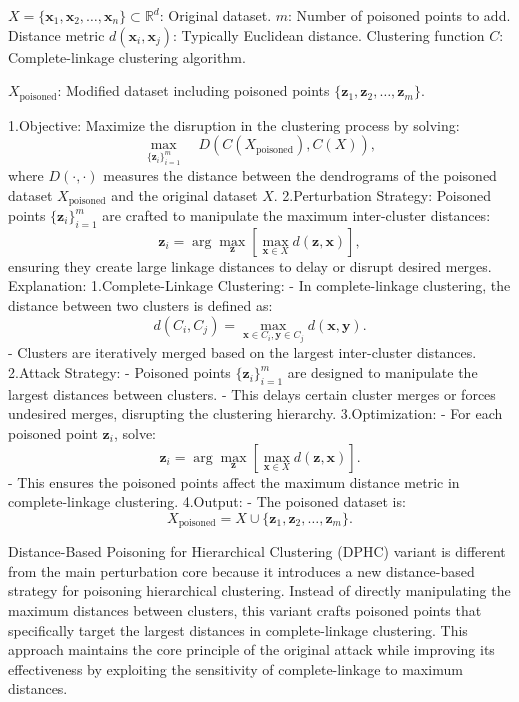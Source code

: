 $X = \{\mathbf{x}_1, \mathbf{x}_2, \ldots, \mathbf{x}_n\} \subset \mathbb{R}^d$: Original dataset.
$m$: Number of poisoned points to add.
Distance metric $d(\mathbf{x}_i, \mathbf{x}_j)$: Typically Euclidean distance.
Clustering function $C$: Complete-linkage clustering algorithm.

$X_{\text{poisoned}}$: Modified dataset including poisoned points $\{\mathbf{z}_1, \mathbf{z}_2, \ldots, \mathbf{z}_m\}$.

1.Objective:
   Maximize the disruption in the clustering process by solving:
   \[
   \max_{\{\mathbf{z}_i\}_{i=1}^m} \quad D(C(X_{\text{poisoned}}), C(X)),
   \]
   where $D(\cdot, \cdot)$ measures the distance between the dendrograms of the poisoned dataset $X_{\text{poisoned}}$ and the original dataset $X$.
2.Perturbation Strategy:
   Poisoned points $\{\mathbf{z}_i\}_{i=1}^m$ are crafted to manipulate the maximum inter-cluster distances:
   \[
   \mathbf{z}_i = \arg \max_{\mathbf{z}} \left[ \max_{\mathbf{x} \in X} d(\mathbf{z}, \mathbf{x}) \right],
   \]
   ensuring they create large linkage distances to delay or disrupt desired merges.
Explanation: 1.Complete-Linkage Clustering:
   - In complete-linkage clustering, the distance between two clusters is defined as:
     \[
     d(C_i, C_j) = \max_{\mathbf{x} \in C_i, \mathbf{y} \in C_j} d(\mathbf{x}, \mathbf{y}).
     \]
   - Clusters are iteratively merged based on the largest inter-cluster distances.
2.Attack Strategy:
   - Poisoned points $\{\mathbf{z}_i\}_{i=1}^m$ are designed to manipulate the largest distances between clusters.
   - This delays certain cluster merges or forces undesired merges, disrupting the clustering hierarchy.
3.Optimization:
   - For each poisoned point $\mathbf{z}_i$, solve:
     \[
     \mathbf{z}_i = \arg \max_{\mathbf{z}} \left[ \max_{\mathbf{x} \in X} d(\mathbf{z}, \mathbf{x}) \right].
     \]
   - This ensures the poisoned points affect the maximum distance metric in complete-linkage clustering.
4.Output:
   - The poisoned dataset is:
     \[
     X_{\text{poisoned}} = X \cup \{\mathbf{z}_1, \mathbf{z}_2, \ldots, \mathbf{z}_m\}.
     \]


Distance-Based Poisoning for Hierarchical Clustering (DPHC) variant is different from the main perturbation core because it introduces a new distance-based strategy for poisoning hierarchical clustering. Instead of directly manipulating the maximum distances between clusters, this variant crafts poisoned points that specifically target the largest distances in complete-linkage clustering. This approach maintains the core principle of the original attack while improving its effectiveness by exploiting the sensitivity of complete-linkage to maximum distances.
